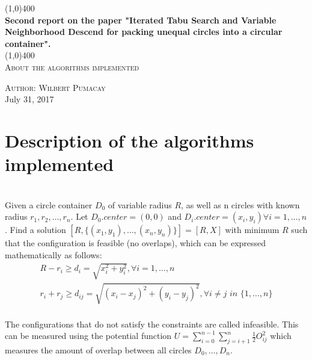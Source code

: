 \documentclass{article}
\begin{document}
\begin{titlepage}
	\begin{center}
	\line(1,0){400}\\
	\huge{\bfseries Second report on the paper "Iterated Tabu Search and 		Variable Neighborhood Descend for packing unequal circles into a circular container".}\\
	\line(1,0){400}\\
	\textsc{\Large About the algorithms implemented}
	\end{center}
	\vspace{5in}
	\begin{flushright}
	\textsc{\large Author: Wilbert Pumacay\\}
	July 31, 2017
	\end{flushright}
	
\end{titlepage}

\section{Description of the algorithms implemented}\label{sec:intro}%
\\

Given a circle container $D_{0}$ of variable radius $R$, as well as n circles with known radius $r_{1},r_{2},\hdots,r_{n}$. Let $D_{0}.center=(0,0)$ and $D_{i}.center=(x_{i},y_{i}) \forall i = 1,\hdots,n$. Find a solution 
$[R,\lbrace(x_{1},y_{1}),\hdots,(x_{n},y_{n})\rbrace]=[R,X]$ with minimum $R$ such that the configuration is feasible (no overlaps), which can be expressed mathematically as follows:
\begin{gather*}
R - r_{i} \geq d_{i} = \sqrt{x^{2}_{i} + y^{2}_{i}}, \forall i=1,\hdots,n \\
r_{i} + r_{j} \geq d_{ij} = \sqrt{(x_{i}-x_{j})^{2} + (y_{i}-y_{j})^{2}}, \forall i \neq j \textit{ in } 
\lbrace1,\hdots,n\rbrace \\
\end{gather*}

The configurations that do not satisfy the constraints are called infeasible. This can be measured using the potential function $U=\sum\limits_{i=0}^{n-1}\sum\limits_{j=i+1}^{n}\frac{1}{2}O_{ij}^{2}$ which measures the amount of overlap between all circles $D_{0},\hdots,D_{n}$.\\
\end{document}
